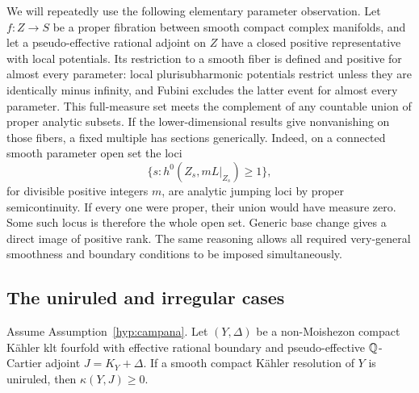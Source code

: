 We will repeatedly use the following elementary parameter observation.
Let \(f:Z\to S\) be a proper fibration between smooth compact complex
manifolds, and let a pseudo-effective rational adjoint on \(Z\) have a
closed positive representative with local potentials. Its restriction
to a smooth fiber is defined and positive for almost every parameter:
local plurisubharmonic potentials restrict unless they are identically
minus infinity, and Fubini excludes the latter event for almost every
parameter. This full-measure set meets the complement of any countable
union of proper analytic subsets. If the lower-dimensional results give
nonvanishing on those fibers, a fixed multiple has sections generically.
Indeed, on a connected smooth parameter open set the loci
\[
 \{s:h^0(Z_s,mL|_{Z_s})\geq1\},
\]
for divisible positive integers \(m\), are analytic jumping loci by
proper semicontinuity. If every one were proper, their union would have
measure zero. Some such locus is therefore the whole open set. Generic
base change gives a direct image of positive rank. The same reasoning
allows all required very-general smoothness and boundary conditions to
be imposed simultaneously.

\subsection{The uniruled and irregular cases}

\begin{lemma}\label{red:uniruled}
Assume Assumption~\ref{hyp:campana}.
Let \((Y,\Delta)\) be a non-Moishezon compact Kähler klt fourfold with
effective rational boundary and pseudo-effective \(\mathbb{Q}\)-Cartier adjoint
\(J=K_Y+\Delta\). If a smooth compact Kähler resolution of \(Y\) is
uniruled, then \(\kappa(Y,J)\geq0\).
\end{lemma}

